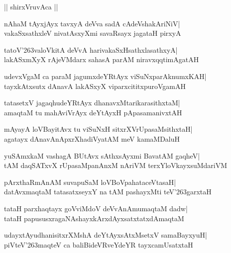 \documentclass[twoside,12pt,openright]{book}
\def\S{\char'263}
\newcounter{shloka}[chapter]
\begin{document}
\begin{center}
|| shirxVruvAca ||
\end{center}
\begin{shloka}%
nAhaM tAyxjAyx tavxyA deVva sadA cAdeVshakAriNiV|\\
vakaSxsathxleV nivatAsxyXmi savaRsayx jagataH pirxyA
\end{shloka}

\begin{shloka}%
tatoV\S valoVkitA deVvA harivakaSxHsathxlasathxyA|\\
lakASxmXyX rAjeVMdarx sahasA parAM niravxqqtimAgatAH
\end{shloka}

\begin{shloka}%
udevxVgaM ca paraM jagumxdeYRtAyx viSuNxparAknumxKAH|\\
tayxkAtxsutx dAnavA lakASxyX viparxcititxpuroVgamAH
\end{shloka}

\begin{shloka}%
tatasetxV jagaqhudeYRtAyx dhanavxMtarikarasithxtaM|\\
amaqtaM tu mahAviVrAyx deYtAyxH pApasamanivxtAH
\end{shloka}

\begin{shloka}%
mAyayA loVBayitAvx tu viSuNxH sitxrXVrUpasaMsithxtaH|\\
agatayx dAnavAnApxrXhadiVyatAM meV kamaMDaluH
\end{shloka}

\begin{shloka}%
yuSAmxkaM vashagA BUtAvx sAthxsAyxmi BavatAM gaqheV|\\
tAM daqSATxvX rUpasaMpanAnxM nAriVM terxYloVkayxsuMdariVM
\end{shloka}

\begin{shloka}%
pArxthaRmAnAM suvapuSaM loVBoVpahataceVtasaH|\\
datAvxmaqtaM tatasatxseyxY na tAM pashayxMti teV\S garxtaH
\end{shloka}

\begin{shloka}%
tataH parxhaqtayx goVviMdoV deVvAnAmumaqtaM dadw|\\
tataH papususxragaNAshayxkArxdAyxsatxtatxdAmaqtaM
\end{shloka}

\begin{shloka}%
udayxtAyudhanisitxrXMshA deYtAyxsAtxMsetxV samaBayxyuH|\\
piVteV\S maqteV ca baliBideVRveYdeYR tayxcamUsatxtaH
\end{shloka}
\end{document}

